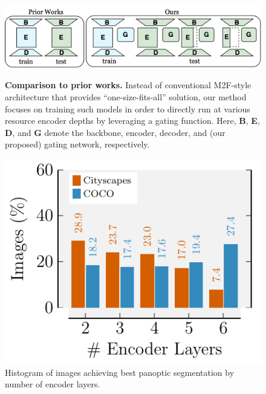 \begin{figure}[!ht]
    \begin{minipage}{0.65\textwidth}
        \centering
        \includegraphics[width=\textwidth]{figures/images/teaser.png}
      \caption{\textbf{Comparison to prior works.} Instead of conventional M2F-style architecture that provides ``one-size-fits-all'' solution, our method \ours focuses on training such models in order to directly run at various resource encoder depths by leveraging a gating function. Here, \textbf{B}, \textbf{E}, \textbf{D}, and \textbf{G} denote the backbone, encoder, decoder, and (our proposed) gating network, respectively.} %
      \label{fig:teaser_a}
    \end{minipage}%
    \hfill
    \begin{minipage}{0.3\textwidth}
        \centering
        \includegraphics[width=\textwidth]{figures/images/image_vs_layer_barplot.pdf}
        \caption{Histogram of images achieving best panoptic segmentation by number of encoder layers.}
        \label{fig:teaser_b}
    \end{minipage}
    
\end{figure}